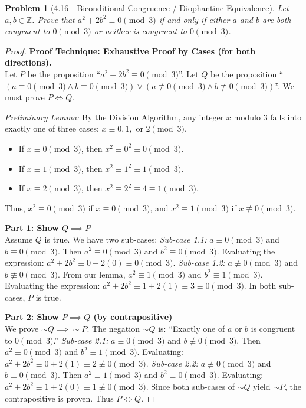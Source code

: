 \documentclass[11pt]{article}
\newtheorem{problem}{Problem}
\begin{document}
\begin{problem}[4.16 - Biconditional Congruence / Diophantine Equivalence]
Let $a, b \in \mathbb{Z}$. Prove that $a^2 + 2b^2 \equiv 0 \pmod 3$ if and only if either $a$ and $b$ are both congruent to $0 \pmod 3$ or neither is congruent to $0 \pmod 3$.
\end{problem}
\begin{proof}
\textbf{Proof Technique: Exhaustive Proof by Cases (for both directions).} \\
Let $P$ be the proposition ``$a^2 + 2b^2 \equiv 0 \pmod 3$''. Let $Q$ be the proposition ``$(a \equiv 0 \pmod 3 \land b \equiv 0 \pmod 3) \lor (a \not\equiv 0 \pmod 3 \land b \not\equiv 0 \pmod 3)$''. We must prove $P \iff Q$.

\textit{Preliminary Lemma:} By the Division Algorithm, any integer $x$ modulo 3 falls into exactly one of three cases: $x \equiv 0, 1, \text{ or } 2 \pmod 3$. 
\begin{itemize}
    \item If $x \equiv 0 \pmod 3$, then $x^2 \equiv 0^2 \equiv 0 \pmod 3$.
    \item If $x \equiv 1 \pmod 3$, then $x^2 \equiv 1^2 \equiv 1 \pmod 3$.
    \item If $x \equiv 2 \pmod 3$, then $x^2 \equiv 2^2 \equiv 4 \equiv 1 \pmod 3$.
\end{itemize}
Thus, $x^2 \equiv 0 \pmod 3$ if $x \equiv 0 \pmod 3$, and $x^2 \equiv 1 \pmod 3$ if $x \not\equiv 0 \pmod 3$.

\textbf{Part 1: Show $Q \implies P$} \\
Assume $Q$ is true. We have two sub-cases:
\textit{Sub-case 1.1:} $a \equiv 0 \pmod 3$ and $b \equiv 0 \pmod 3$. 
Then $a^2 \equiv 0 \pmod 3$ and $b^2 \equiv 0 \pmod 3$. 
Evaluating the expression: $a^2 + 2b^2 \equiv 0 + 2(0) \equiv 0 \pmod 3$.
\textit{Sub-case 1.2:} $a \not\equiv 0 \pmod 3$ and $b \not\equiv 0 \pmod 3$. 
From our lemma, $a^2 \equiv 1 \pmod 3$ and $b^2 \equiv 1 \pmod 3$.
Evaluating the expression: $a^2 + 2b^2 \equiv 1 + 2(1) \equiv 3 \equiv 0 \pmod 3$.
In both sub-cases, $P$ is true.

\textbf{Part 2: Show $P \implies Q$ (by contrapositive)} \\
We prove $\sim Q \implies \sim P$. The negation $\sim Q$ is: ``Exactly one of $a$ or $b$ is congruent to $0 \pmod 3$.''
\textit{Sub-case 2.1:} $a \equiv 0 \pmod 3$ and $b \not\equiv 0 \pmod 3$. 
Then $a^2 \equiv 0 \pmod 3$ and $b^2 \equiv 1 \pmod 3$.
Evaluating: $a^2 + 2b^2 \equiv 0 + 2(1) \equiv 2 \not\equiv 0 \pmod 3$.
\textit{Sub-case 2.2:} $a \not\equiv 0 \pmod 3$ and $b \equiv 0 \pmod 3$. 
Then $a^2 \equiv 1 \pmod 3$ and $b^2 \equiv 0 \pmod 3$.
Evaluating: $a^2 + 2b^2 \equiv 1 + 2(0) \equiv 1 \not\equiv 0 \pmod 3$.
Since both sub-cases of $\sim Q$ yield $\sim P$, the contrapositive is proven. Thus $P \iff Q$.
\end{proof}
\end{document}
